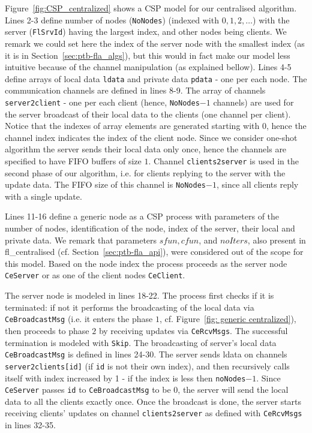 \documentclass[runningheads]{llncs}
\begin{document}
Figure~\ref{fig:CSP_centralized} shows a CSP model for our centralised algorithm. 
Lines 2-3 define number of nodes  (\lstinline{NoNodes}) %
(indexed with $0, 1, 2, \ldots$) with the server (\lstinline{FlSrvId}) having the largest index, and other nodes being clients.  
We remark we could set here the index of the server node with the smallest index (as it is in Section~\ref{sec:ptb-fla_algs}), but this would in fact make our model less intuitive because of the channel manipulation (as explained bellow). 
Lines 4-5 define arrays of local data \lstinline{ldata} and private data \lstinline{pdata} - one per each node. 
%
The communication channels are defined in lines 8-9. 
The array of channels \lstinline{server2client}    - one per each client (hence, \lstinline{NoNodes}$-1$ channels) are used for the server broadcast of their local data to the clients (one channel per client). Notice that the indexes of array elements are generated starting with $0$, hence the channel index indicates the index of the client node.   
Since we consider one-shot algorithm the server sends their local data only once, hence the channels are specified to have FIFO buffers of size $1$. 
Channel \lstinline{clients2server} is used in the second phase of our algorithm, i.e. for clients replying to the server with the update data. The FIFO size of this channel is \lstinline{NoNodes}$-1$, since all clients reply with a single update. 

Lines 11-16 define a generic node as a CSP process with parameters of the number of nodes, identification of the node, index of the server, their local and private data. 
We remark that parameters $sfun, cfun$, and $noIters$, also present in fl\_centralised (cf. Section~\ref{sec:ptb-fla_api}), were considered out of the scope for this model. 
Based on the node index the process proceeds as the server node \lstinline{CeServer} or as one of the client nodes \lstinline{CeClient}. 

The server node is modeled in lines 18-22. The process first checks if it is terminated: if not it performs the broadcasting of the local data via \lstinline{CeBroadcastMsg} (i.e. it enters the phase $1$, cf. Figure~\ref{fig: generic centralized}), then proceeds to phase $2$ by receiving updates  via \lstinline{CeRcvMsgs}. 
The successful termination is modeled with \lstinline{Skip}. 
%
The broadcasting of server's local data \lstinline{CeBroadcastMsg} is defined in lines 24-30. 
The server sends ldata on channels \lstinline{server2clients[id]} (if \lstinline{id} is not their own index), and then recursively calls itself with index increased by 1 - if the index is less then \lstinline{noNodes}$-1$. 
Since \lstinline{CeServer} passes \lstinline{id} to \lstinline{CeBroadcastMsg} to be 0, the server will send the local data to all the clients exactly once. 
% 
Once the broadcast is done, the server starts receiving clients' updates on channel \lstinline{clients2server} as defined with  \lstinline{CeRcvMsgs} in lines 32-35.
\end{document}

